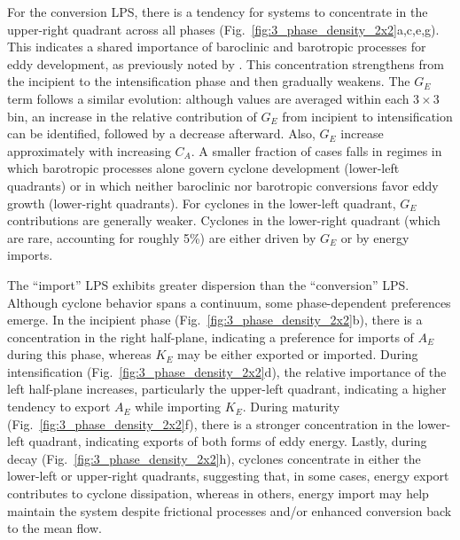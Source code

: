 \documentclass[pdflatex,sn-chicago]{sn-jnl}%
\theoremstyle{plain}
\theoremstyle{definition}
\theoremstyle{remark}
\theoremstyle{definition}
\begin{document}
For the conversion LPS, there is a tendency for systems to concentrate in the upper-right quadrant across all phases (Fig.~\ref{fig:3_phase_density_2x2}a,c,e,g). This indicates a shared importance of baroclinic and barotropic processes for eddy development, as previously noted by \citet{de2025lorenz}. This concentration strengthens from the incipient to the intensification phase and then gradually weakens. The $G_E$ term follows a similar evolution: although values are averaged within each $3 \times 3$ bin, an increase in the relative contribution of $G_E$ from incipient to intensification can be identified, followed by a decrease afterward. Also, $G_E$ increase approximately with increasing $C_A$. A smaller fraction of cases falls in regimes in which barotropic processes alone govern cyclone development (lower-left quadrants) or in which neither baroclinic nor barotropic conversions favor eddy growth (lower-right quadrants). For cyclones in the lower-left quadrant, $G_E$ contributions are generally weaker. Cyclones in the lower-right quadrant (which are rare, accounting for roughly 5\%) are either driven by $G_E$ or by energy imports.

The ``import'' LPS exhibits greater dispersion than the ``conversion'' LPS. Although cyclone behavior spans a continuum, some phase-dependent preferences emerge. In the incipient phase (Fig.~\ref{fig:3_phase_density_2x2}b), there is a concentration in the right half-plane, indicating a preference for imports of $A_E$ during this phase, whereas $K_E$ may be either exported or imported. During intensification (Fig.~\ref{fig:3_phase_density_2x2}d), the relative importance of the left half-plane increases, particularly the upper-left quadrant, indicating a higher tendency to export $A_E$ while importing $K_E$. During maturity (Fig.~\ref{fig:3_phase_density_2x2}f), there is a stronger concentration in the lower-left quadrant, indicating exports of both forms of eddy energy. Lastly, during decay (Fig.~\ref{fig:3_phase_density_2x2}h), cyclones concentrate in either the lower-left or upper-right quadrants, suggesting that, in some cases, energy export contributes to cyclone dissipation, whereas in others, energy import may help maintain the system despite frictional processes \citep{de2025lorenz} and/or enhanced conversion back to the mean flow.
\end{document}
